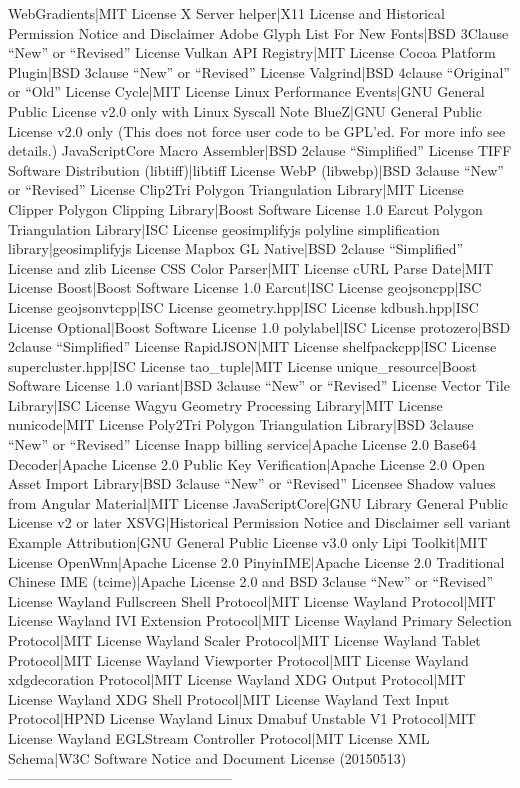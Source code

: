 \documentclass[letterpaper,10pt,english]{sphinxmanual}
\begin{document}
WebGradients|MIT License
X Server helper|X11 License and Historical Permission Notice and Disclaimer
Adobe Glyph List For New Fonts|BSD 3\sphinxhyphen{}Clause “New” or “Revised” License
Vulkan API Registry|MIT License
Cocoa Platform Plugin|BSD 3\sphinxhyphen{}clause “New” or “Revised” License
Valgrind|BSD 4\sphinxhyphen{}clause “Original” or “Old” License
Cycle|MIT License
Linux Performance Events|GNU General Public License v2.0 only with Linux Syscall Note
BlueZ|GNU General Public License v2.0 only (This does not force user code to be GPL’ed. For more info see details.)
JavaScriptCore Macro Assembler|BSD 2\sphinxhyphen{}clause “Simplified” License
TIFF Software Distribution (libtiff)|libtiff License
WebP (libwebp)|BSD 3\sphinxhyphen{}clause “New” or “Revised” License
Clip2Tri Polygon Triangulation Library|MIT License
Clipper Polygon Clipping Library|Boost Software License 1.0
Earcut Polygon Triangulation Library|ISC License
geosimplify\sphinxhyphen{}js polyline simplification library|geosimplify\sphinxhyphen{}js License
Mapbox GL Native|BSD 2\sphinxhyphen{}clause “Simplified” License and zlib License
CSS Color Parser|MIT License
cURL Parse Date|MIT License
Boost|Boost Software License 1.0
Earcut|ISC License
geojson\sphinxhyphen{}cpp|ISC License
geojson\sphinxhyphen{}vt\sphinxhyphen{}cpp|ISC License
geometry.hpp|ISC License
kdbush.hpp|ISC License
Optional|Boost Software License 1.0
polylabel|ISC License
protozero|BSD 2\sphinxhyphen{}clause “Simplified” License
RapidJSON|MIT License
shelf\sphinxhyphen{}pack\sphinxhyphen{}cpp|ISC License
supercluster.hpp|ISC License
tao\_tuple|MIT License
unique\_resource|Boost Software License 1.0
variant|BSD 3\sphinxhyphen{}clause “New” or “Revised” License
Vector Tile Library|ISC License
Wagyu Geometry Processing Library|MIT License
nunicode|MIT License
Poly2Tri Polygon Triangulation Library|BSD 3\sphinxhyphen{}clause “New” or “Revised” License
In\sphinxhyphen{}app billing service|Apache License 2.0
Base64 Decoder|Apache License 2.0
Public Key Verification|Apache License 2.0
Open Asset Import Library|BSD 3\sphinxhyphen{}clause “New” or “Revised” Licensee
Shadow values from Angular Material|MIT License
JavaScriptCore|GNU Library General Public License v2 or later
XSVG|Historical Permission Notice and Disclaimer \sphinxhyphen{} sell variant
Example Attribution|GNU General Public License v3.0 only
Lipi Toolkit|MIT License
OpenWnn|Apache License 2.0
PinyinIME|Apache License 2.0
Traditional Chinese IME (tcime)|Apache License 2.0 and BSD 3\sphinxhyphen{}clause “New” or “Revised” License
Wayland Fullscreen Shell Protocol|MIT License
Wayland Protocol|MIT License
Wayland IVI Extension Protocol|MIT License
Wayland Primary Selection Protocol|MIT License
Wayland Scaler Protocol|MIT License
Wayland Tablet Protocol|MIT License
Wayland Viewporter Protocol|MIT License
Wayland xdg\sphinxhyphen{}decoration Protocol|MIT License
Wayland XDG Output Protocol|MIT License
Wayland XDG Shell Protocol|MIT License
Wayland Text Input Protocol|HPND License
Wayland Linux Dmabuf Unstable V1 Protocol|MIT License
Wayland EGLStream Controller Protocol|MIT License
XML Schema|W3C Software Notice and Document License (2015\sphinxhyphen{}05\sphinxhyphen{}13)
———\sphinxhyphen{}{\color{red}\bfseries{}|}—————————————
\end{document}
